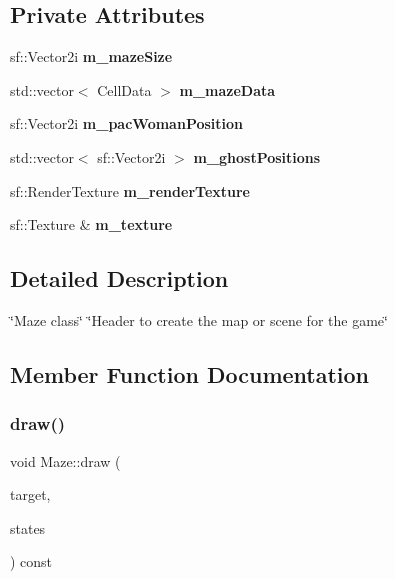 \subsection*{Private Attributes}
\begin{DoxyCompactItemize}
\item 
\mbox{\label{classMaze_aa07b6c090649dc10ed828722f320a2f6}} 
sf\+::\+Vector2i {\bfseries m\+\_\+maze\+Size}
\item 
\mbox{\label{classMaze_a1d003f092dd8062dee69b10b4db03ac7}} 
std\+::vector$<$ Cell\+Data $>$ {\bfseries m\+\_\+maze\+Data}
\item 
\mbox{\label{classMaze_a7bcd5cfd876cae970f08a3b0b1fc0519}} 
sf\+::\+Vector2i {\bfseries m\+\_\+pac\+Woman\+Position}
\item 
\mbox{\label{classMaze_a8d47c88013a9790a98df18ee84d4f1e1}} 
std\+::vector$<$ sf\+::\+Vector2i $>$ {\bfseries m\+\_\+ghost\+Positions}
\item 
\mbox{\label{classMaze_a0c48b4985799f4e2d806fef12c3abac9}} 
sf\+::\+Render\+Texture {\bfseries m\+\_\+render\+Texture}
\item 
\mbox{\label{classMaze_ad0cddb2a4cc5c621199b8c36095b0f04}} 
sf\+::\+Texture \& {\bfseries m\+\_\+texture}
\end{DoxyCompactItemize}


\subsection{Detailed Description}
\char`\"{}\+Maze class\char`\"{}  \char`\"{}\+Header to create the map or scene for the game\char`\"{} 

\subsection{Member Function Documentation}
\mbox{\label{classMaze_a50e027e616c734c6c4b117ed04576539}} 
\subsubsection{\texorpdfstring{draw()}{draw()}}
{\footnotesize\ttfamily void Maze\+::draw (\begin{DoxyParamCaption}\item[{sf\+::\+Render\+Target \&}]{target,  }\item[{sf\+::\+Render\+States}]{states }\end{DoxyParamCaption}) const\hspace{0.3cm}{\ttfamily [private]}}




